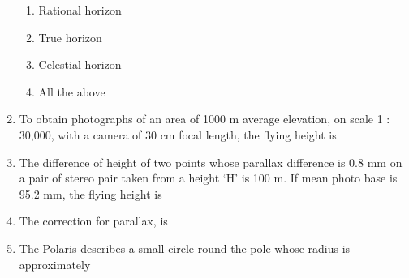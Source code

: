 \documentclass[11pt,a4paper]{article}
\begin{document}
\begin{enumerate}
\begin{enumerate}[label=\Alph*.]
\item{Rational horizon}
\item{True horizon}
\item{Celestial horizon}
\item{All the above}
\end{enumerate}
\item{To obtain photographs of an area of 1000 m average elevation, on scale 1 : 30,000, with a camera of 30 cm focal length, the flying height is}
\\
\item{The difference of height of two points whose parallax difference is 0.8 mm on a pair of stereo pair taken from a height `H' is 100 m. If mean photo base is 95.2 mm, the flying height is
}
\\
\item{The correction for parallax, is}
\\
\item{The Polaris describes a small circle round the pole whose radius is approximately}
\\
\end{enumerate}
\end{document}
